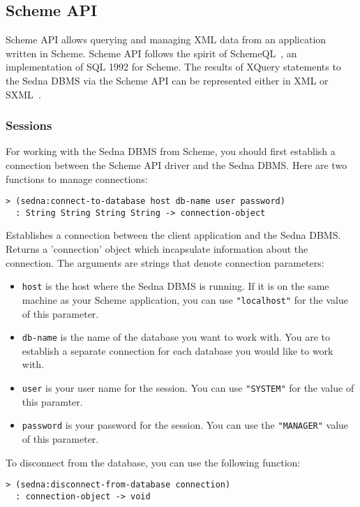 \documentclass[a4paper,12pt]{article}
\newenvironment{citemize}
{\begin{itemize}
  \setlength{\itemsep}{0pt}
  \setlength{\parskip}{0pt}
  \setlength{\parsep}{0pt}}
{\end{itemize}}
\begin{document}
\subsection{Scheme API}

Scheme API allows querying and managing XML data from an application written in
Scheme. Scheme API follows the spirit of SchemeQL~\cite{paper:scheme-ql}, an
implementation of SQL 1992 for Scheme. The results of XQuery statements to the
Sedna DBMS via the Scheme API can be represented either in XML or
SXML~\cite{paper:sxml}.


\subsubsection{Sessions}
For working with the Sedna DBMS from Scheme, you should first establish a
connection between the Scheme API driver and the Sedna DBMS. Here are two
functions to manage connections:

\begin{verbatim}
> (sedna:connect-to-database host db-name user password)
  : String String String String -> connection-object
\end{verbatim}

Establishes a connection between the client application and the Sedna DBMS.
Returns a 'connection' object which incapsulate information about the
connection.
The arguments are strings that denote connection parameters:

\begin{citemize}
\item \texttt{host} is the host where the Sedna DBMS is running. If it is on the
same machine as your Scheme application, you can use \texttt{"localhost"} for
the value of this parameter.
\item \texttt{db-name} is the name of the database you want to work with. You
are to establish a separate connection for each database you would like to work
with.
\item \texttt{user} is your user name for the session. You can use
\texttt{"SYSTEM"} for the value of this paramter.
\item \texttt{password} is your password for the session. You can use the
\texttt{"MANAGER"} value of this parameter.
\end{citemize}

To disconnect from the database, you can use the following function:

\begin{verbatim}
> (sedna:disconnect-from-database connection)
  : connection-object -> void
\end{verbatim}
\end{document}
